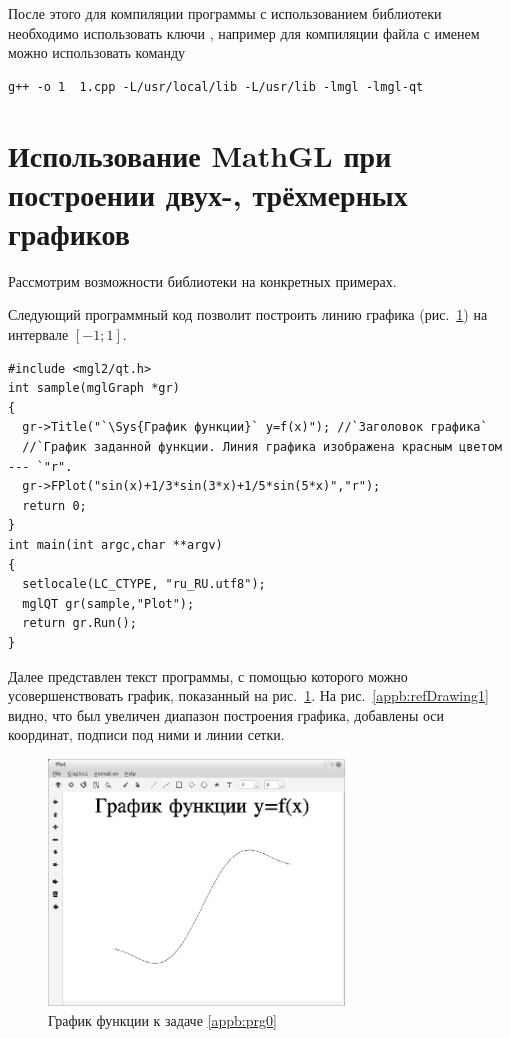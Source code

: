 После этого для компиляции программы с использованием библиотеки  необходимо использовать ключи , например для компиляции файла с именем  можно использовать команду
\begin{verbatim}
g++ -o 1  1.cpp -L/usr/local/lib -L/usr/lib -lmgl -lmgl-qt
\end{verbatim}


\section[Использование MathGL при построении двух-, трёхмерных графиков]{Использование MathGL при построении двух-, трёхмерных графиков}
Рассмотрим возможности библиотеки на конкретных примерах.


Следующий программный код позволит построить линию графика (рис.~\ref{appb:refDrawing0}) на интервале $[-1;1]$.
\begin{lstlisting}
#include <mgl2/qt.h>
int sample(mglGraph *gr)
{
  gr->Title("`\Sys{График функции}` y=f(x)"); //`Заголовок графика`
  //`График заданной функции. Линия графика изображена красным цветом --- `"r".
  gr->FPlot("sin(x)+1/3*sin(3*x)+1/5*sin(5*x)","r");
  return 0;
}
int main(int argc,char **argv)
{
  setlocale(LC_CTYPE, "ru_RU.utf8");
  mglQT gr(sample,"Plot");
  return gr.Run();
}
\end{lstlisting}

Далее представлен текст программы, с помощью которого можно усовершенствовать график, показанный на рис.~\ref{appb:refDrawing0}. 
На рис.~\ref{appb:refDrawing1} видно, что был увеличен диапазон построения графика, добавлены оси координат,
подписи под ними и линии сетки.

\begin{figure}[htb]
\begin{center}
\includegraphics[width=0.7\textwidth]{img/ris_appb_1}
\caption{График функции к задаче \ref{appb:prg0}}
\label{appb:refDrawing0}
\end{center}
\end{figure}

